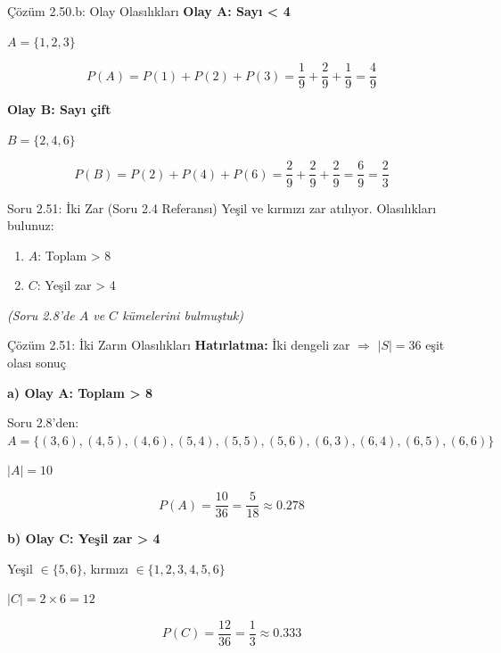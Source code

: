 \documentclass[light]{lutbeamer}
\begin{document}
\begin{frame}{Çözüm 2.50.b: Olay Olasılıkları}
    \color{blue}
    \textbf{Olay A: Sayı < 4}
    
    $A = \{1, 2, 3\}$
    
    \[ P(A) = P(1) + P(2) + P(3) = \frac{1}{9} + \frac{2}{9} + \frac{1}{9} = \frac{4}{9} \]
    
    \vspace{0.5cm}
    \textbf{Olay B: Sayı çift}
    
    $B = \{2, 4, 6\}$
    
    \[ P(B) = P(2) + P(4) + P(6) = \frac{2}{9} + \frac{2}{9} + \frac{2}{9} = \frac{6}{9} = \frac{2}{3} \]
    
    \begin{center}
    \end{center}
\end{frame}

\begin{frame}{Soru 2.51: İki Zar (Soru 2.4 Referansı)}
    Yeşil ve kırmızı zar atılıyor. Olasılıkları bulunuz:
    \begin{enumerate}
        \item $A$: Toplam > 8
        \item $C$: Yeşil zar > 4
    \end{enumerate}
    
    \textit{(Soru 2.8'de $A$ ve $C$ kümelerini bulmuştuk)}
\end{frame}

\begin{frame}{Çözüm 2.51: İki Zarın Olasılıkları}
    \color{blue}
    \textbf{Hatırlatma:} İki dengeli zar $\Rightarrow$ $|S| = 36$ eşit olası sonuç
    
    \vspace{0.3cm}
    \textbf{a) Olay A: Toplam > 8}
    
    Soru 2.8'den: $A = \{(3,6), (4,5), (4,6), (5,4), (5,5), (5,6), (6,3), (6,4), (6,5), (6,6)\}$
    
    $|A| = 10$
    
    \[ P(A) = \frac{10}{36} = \frac{5}{18} \approx 0.278 \]
    
    \vspace{0.5cm}
    \textbf{b) Olay C: Yeşil zar > 4}
    
    Yeşil $\in \{5, 6\}$, kırmızı $\in \{1,2,3,4,5,6\}$
    
    $|C| = 2 \times 6 = 12$
    
    \[ P(C) = \frac{12}{36} = \frac{1}{3} \approx 0.333 \]
\end{frame}
\end{document}
